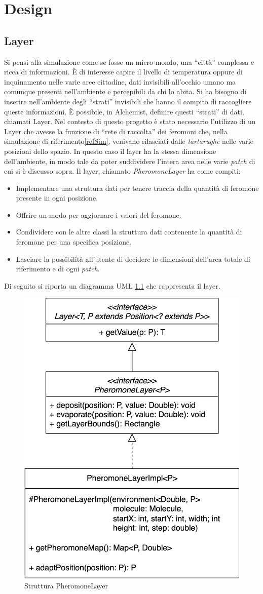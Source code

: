 \chapter{Design}
\section{Layer}
Si pensi alla simulazione come se fosse un micro-mondo, una ``città'' complessa
e ricca di informazioni. È di interesse capire il livello di temperatura oppure di inquinamento nelle varie aree cittadine, dati invisibili
all'occhio umano ma comunque presenti nell'ambiente e percepibili da chi lo abita. Si ha bisogno
di inserire nell'ambiente degli ``strati'' invisibili che hanno il compito di raccogliere queste informazioni.
È possibile, in Alchemist, definire questi ``strati'' di dati, chiamati Layer.
\newline
Nel contesto di questo progetto è stato necessario l'utilizzo di un Layer che avesse la funzione di ``rete di raccolta''
dei feromoni che, nella simulazione di riferimento\space\ref{refSim}, venivano rilasciati dalle \textit{tartarughe} nelle varie posizioni
dello spazio. In questo caso il layer ha la stessa dimensione dell'ambiente, in modo tale da poter suddividere l'intera area nelle varie \textit{patch} di cui si 
è discusso sopra.
Il layer, chiamato \textit{PheromoneLayer} ha come compiti:
\begin{itemize}
    \item Implementare una struttura dati per tenere traccia della quantità di feromone presente in ogni posizione.
    \item Offrire un modo per aggiornare i valori del feromone.
    \item Condividere con le altre classi la struttura dati contenente la quantità di feromone per una specifica posizione.
    \item Lasciare la possibilità all'utente di decidere le dimensioni dell'area totale di riferimento e di ogni \textit{patch}.
\end{itemize}
Di seguito si riporta un diagramma UML \cref{fig:phLayer} che rappresenta il layer.
\begin{figure}[ht]
    \centering
    \includegraphics[width=.5\linewidth]{figures/pheromoneLayer.png}
    \caption{Struttura PheromoneLayer}\label{fig:phLayer}
\end{figure}

